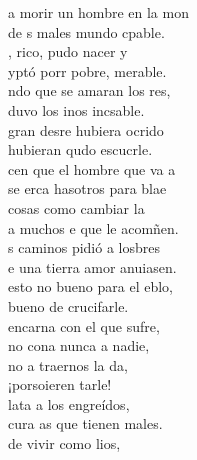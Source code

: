 \begin{cancion}%
	 a morir un hombre en la mon\\
	de s males  mundo cpable. \\
	, rico, pudo nacer y \\
	yptó porr pobre, merable.\\
	ndo que se amaran los res,\\
	duvo los inos incsable.\\
	gran desre hubiera ocrido\\
	 hubieran qudo escucrle.\\
	cen que el hombre que va a \\
	se erca hasotros para blae\\
	 cosas como cambiar la \\
	a muchos e que le acomñen.\\
	s caminos pidió a losbres\\
	e una tierra amor anuiasen.\\
	 esto no bueno para el eblo,\\
	 bueno de crucifarle.\\
	 encarna con el que sufre,\\
	no cona nunca a nadie,\\
	no a traernos la da,\\
	¡porsoieren tarle!\\
	lata a los engreídos,\\
	cura as que tienen males.\\
	de vivir como lios,\\

\end{cancion}
